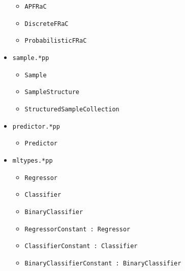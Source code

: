 \documentclass{article}
\newcommand{\extends}[1]{ : \textcolor{superclass}{#1}}
\newcommand{\filename}[1]{\texttt{\color{filename}#1}}
\begin{document}
\begin{multicols}{2}
\begin{itemize}
\begin{itemize}
\item \texttt{APFRaC}
\item \texttt{DiscreteFRaC}
\item \texttt{ProbabilisticFRaC}
\end{itemize}
\item \filename{sample.*pp}
\begin{itemize}
\item \texttt{Sample}
\item \texttt{SampleStructure}
\item \texttt{StructuredSampleCollection}
\end{itemize}
\item \filename{predictor.*pp}
\begin{itemize}
\item \texttt{Predictor}
\end{itemize}
\item \filename{mltypes.*pp}
\begin{itemize}
\item \texttt{\color{abstract}Regressor}
\item \texttt{\color{abstract}Classifier}
\item \texttt{\color{abstract}BinaryClassifier}

\item \texttt{RegressorConstant\extends{Regressor}}
\item \texttt{ClassifierConstant\extends{Classifier}}
\item \texttt{BinaryClassifierConstant\extends{BinaryClassifier}}


\end{itemize}
\end{itemize}
\end{multicols}
\end{document}
